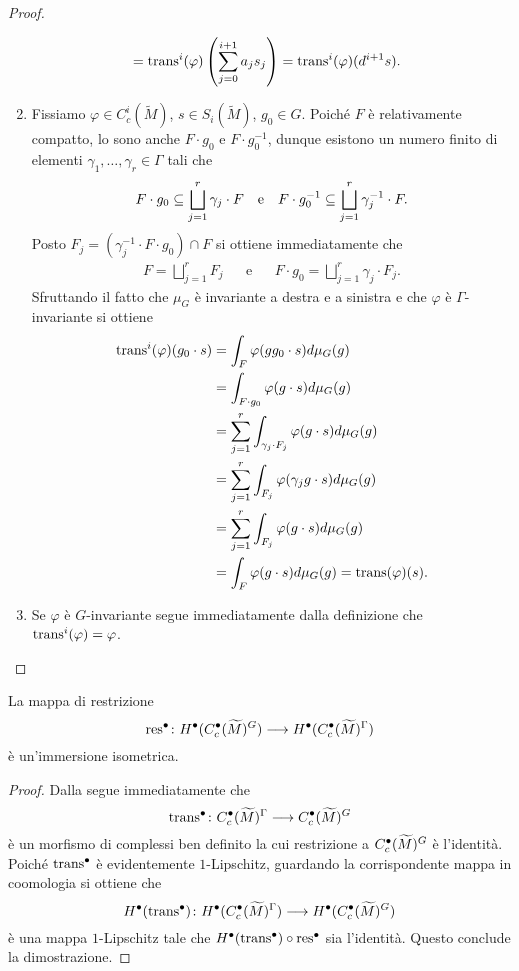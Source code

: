 \begin{proof}
\begin{enumerate}
\begin{align*}
&=\operatorname{trans}^i(\varphi)\left(\sum_{j=0}^{i+1}a_js_j\right)=\operatorname{trans}^i(\varphi)(d^{i+1}s).
\end{align*}
\item Fissiamo $\varphi\in C^i_c(\widetilde M)$, $s\in S_i(\widetilde M)$, $g_0\in G$. Poiché $F$ è relativamente compatto, lo sono anche $F\cdot g_0$ e $F\cdot g_0^{-1}$, dunque esistono un numero finito di elementi $\gamma_1,\ldots,\gamma_r\in\Gamma$ tali che
\begin{align*}
F\cdot g_0\subseteq\bigsqcup_{j=1}^r\gamma_j\cdot F&&\text{e}&&F\cdot g_0^{-1}\subseteq\bigsqcup_{j=1}^r\gamma_j^{-1}\cdot F.
\end{align*}
Posto $F_j=(\gamma_j^{-1}\cdot F\cdot g_0)\cap F$ si ottiene immediatamente che
\begin{align*}
F=\bigsqcup_{j=1}^rF_j&&\text{e}&&F\cdot g_0=\bigsqcup_{j=1}^r\gamma_j\cdot F_j.
\end{align*}
Sfruttando il fatto che $\mu_G$ è invariante a destra e a sinistra e che $\varphi$ è $\Gamma$-invariante si ottiene
\begin{align*}
\operatorname{trans}^i(\varphi)(g_0\cdot s)&=\int_F\varphi(gg_0\cdot s)d\mu_G(g)\\
&=\int_{F\cdot g_0}\varphi(g\cdot s)d\mu_G(g)\\
&=\sum_{j=1}^r\int_{\gamma_j\cdot F_j}\varphi(g\cdot s)d\mu_G(g)\\
&=\sum_{j=1}^r\int_{F_j}\varphi(\gamma_jg\cdot s)d\mu_G(g)\\
&=\sum_{j=1}^r\int_{F_j}\varphi(g\cdot s)d\mu_G(g)\\
&=\int_F\varphi(g\cdot s)d\mu_G(g)=\operatorname{trans}(\varphi)(s).
\end{align*}
\item Se $\varphi$ è $G$-invariante segue immediatamente dalla definizione che $\operatorname{trans}^i(\varphi)=\varphi$.\qedhere
\end{enumerate}
\end{proof}

\begin{corollary}
La mappa di restrizione
\[
\map{\res^\bul}{H^\bul(C^\bul_c(\widetilde M)^G)}{H^\bul(C^\bul_c(\widetilde M)^\Gamma)}
\]
è un'immersione isometrica.
\end{corollary}
\begin{proof}
Dalla  segue immediatamente che
\[
\map{\trans^\bul}{C^\bul_c(\widetilde M)^\Gamma}{C^\bul_c(\widetilde M)^G}
\]
è un morfismo di complessi ben definito la cui restrizione a $C^\bullet_c(\widetilde M)^G$ è l'identità. Poiché $\operatorname{trans}^\bullet$ è evidentemente $1$-Lipschitz, guardando la corrispondente mappa in coomologia si ottiene che
\[
\map{H^\bul(\trans^\bul)}{H^\bul(C^\bul_c(\widetilde M)^\Gamma)}{H^\bul(C^\bul_c(\widetilde M)^G)}
\]
è una mappa $1$-Lipschitz tale che $H^\bullet(\operatorname{trans}^\bullet)\circ \operatorname{res}^\bullet$ sia l'identità. Questo conclude la dimostrazione.
\end{proof}


